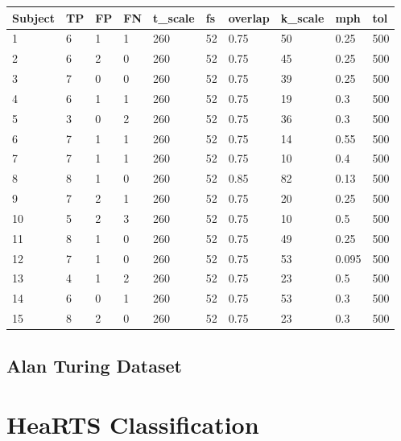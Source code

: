 \begin{table*}[!ht]
    \centering
	\begin{adjustbox}{width=\textwidth}
    \begin{tabular}{l|lllllllll}
        \toprule[0.5mm]
        Subject & TP & FP & FN & t\_scale & fs & overlap & k\_scale & mph & tol \\
		\midrule[0.3mm]
        1&6 & 1 & 1 & 260 & 52 & 0.75 & 50 & 0.25 & 500 \\ 
        2&6 & 2 & 0 & 260 & 52 & 0.75 & 45 & 0.25 & 500 \\ 
        3&7 & 0 & 0 & 260 & 52 & 0.75 & 39 & 0.25 & 500 \\ 
        4&6 & 1 & 1 & 260 & 52 & 0.75 & 19 & 0.3 & 500 \\ 
        5&3 & 0 & 2 & 260 & 52 & 0.75 & 36 & 0.3 & 500 \\ 
        6&7 & 1 & 1 & 260 & 52 & 0.75 & 14 & 0.55 & 500 \\ 
        7&7 & 1 & 1 & 260 & 52 & 0.75 & 10 & 0.4 & 500 \\ 
        8&8 & 1 & 0 & 260 & 52 & 0.85 & 82 & 0.13 & 500 \\ 
        9&7 & 2 & 1 & 260 & 52 & 0.75 & 20 & 0.25 & 500 \\ 
        10&5 & 2 & 3 & 260 & 52 & 0.75 & 10 & 0.5 & 500 \\ 
        11&8 & 1 & 0 & 260 & 52 & 0.75 & 49 & 0.25 & 500 \\ 
        12&7 & 1 & 0 & 260 & 52 & 0.75 & 53 & 0.095 & 500 \\ 
        13&4 & 1 & 2 & 260 & 52 & 0.75 & 23 & 0.5 & 500 \\ 
        14&6 & 0 & 1 & 260 & 52 & 0.75 & 53 & 0.3 & 500 \\ 
        15&8 & 2 & 0 & 260 & 52 & 0.75 & 23 & 0.3 & 500 \\
    \bottomrule[0.5mm]
    \end{tabular}
	\end{adjustbox}
\end{table*}

\subsection{Alan Turing Dataset}

\section{HeaRTS Classification}
\label{app:tables_detailed_hearts}

